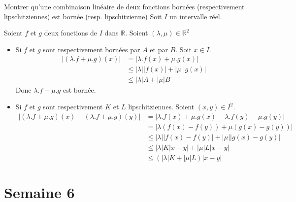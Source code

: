 \documentclass{article}
\renewenvironment{question_kholle}[2][ ]
{
	\subsection{\texorpdfstring{#2}{}}
	\notblank{#1}
	{
		\noindent #1
		\bigbreak
	}
	{}
	\begin{proof}
}
{
	\end{proof}
}
\begin{document}
\begin{question_kholle}{Montrer qu'une combinaison linéaire de deux fonctions bornées (respectivement lipschitziennes) est bornée (resp. lipschitzienne)}
	Soit $I$ un intervalle réel.

	Soient $f$ et $g$ deux fonctions de $I$ dans $\mathbb{R}$. Soient $(\lambda, \mu) \in \mathbb{R}^2$
	\begin{itemize}[label=$\lozenge$]
		\item Si $f$ et $g$ sont respectivement bornées par $A$ et par $B$.
		      Soit $x \in I$.
		      \begin{align*}
			      \Big| (\lambda.f + \mu.g)(x) \Big| & = \Big| \lambda.f(x) + \mu.g(x) \Big|                                             \\
			                                         & \leqslant \big| \lambda \big|  \big|f(x)\big| + \big| \mu \big|  \big| g(x) \big| \\
			                                         & \leqslant \big| \lambda \big| A + \big| \mu \big| B
		      \end{align*}
		      Donc $\lambda.f + \mu.g$ est bornée.
		\item Si $f$ et $g$ sont respectivement $K$ et $L$ lipschitziennes.
		      Soient $(x, y) \in I^2$.
		      \begin{align*}
			      \Big| (\lambda.f + \mu.g)(x) - (\lambda.f + \mu.g)(y)\Big| & = \Big| \lambda.f(x) + \mu.g(x) - \lambda.f(y) - \mu.g(y) \Big|                                   \\
			                                                                 & = \Big| \lambda(f(x) - f(y)) + \mu(g(x) - g(y)) \Big|                                             \\
			                                                                 & \leqslant \Big| \lambda  \Big|  \Big| f(x) - f(y) \Big| + \Big| \mu \Big|  \Big|g(x) - g(y) \Big| \\
			                                                                 & \leqslant \Big| \lambda  \Big|  K \Big| x-y \Big| + \Big| \mu  \Big| L  \Big| x - y \Big|         \\
			                                                                 & \leqslant (|\lambda| K + |\mu|L ) |x - y|
		      \end{align*}
	\end{itemize}
\end{question_kholle}
\pagebreak\section{Semaine 6}
\end{document}
